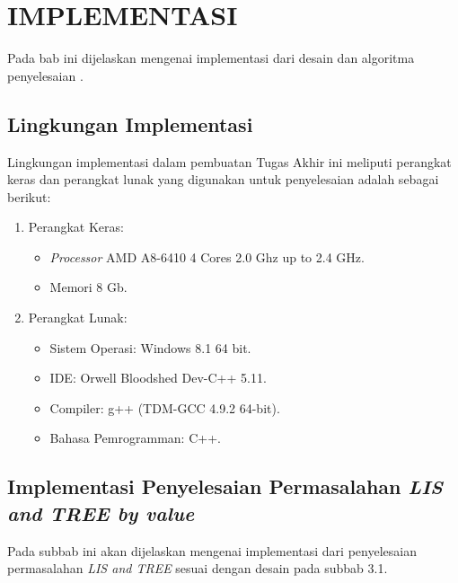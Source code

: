\chapter{IMPLEMENTASI}
\label{chapter:implementasi}

Pada bab ini dijelaskan mengenai implementasi dari desain dan algoritma penyelesaian \problem{}.

\section{\quad Lingkungan Implementasi}
Lingkungan implementasi dalam pembuatan Tugas Akhir ini meliputi perangkat keras dan perangkat lunak yang digunakan untuk penyelesaian \problem{} adalah sebagai berikut:
\begin{enumerate}
	\item Perangkat Keras:
		\begin{itemize}
			\item \textit{Processor} AMD A8-6410 4 Cores 2.0 Ghz up to 2.4 GHz.
			\item Memori 8 Gb.
		\end{itemize}
	\item Perangkat Lunak:
		\begin{itemize}
			\item Sistem Operasi: Windows 8.1 64 bit.
			\item IDE: Orwell Bloodshed Dev-C++ 5.11.
			\item Compiler: g++ (TDM-GCC 4.9.2 64-bit).
			\item Bahasa Pemrogramman: C++.
		\end{itemize}
\end{enumerate}

\section{\quad Implementasi Penyelesaian Permasalahan \textit{LIS and TREE by value}}
\quad Pada subbab ini akan dijelaskan mengenai implementasi dari penyelesaian permasalahan \textit{LIS and TREE} sesuai dengan desain pada subbab 3.1.

